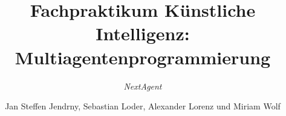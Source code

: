 \documentclass[runningheads]{llncs}
\begin{document}
%
\title{Fachpraktikum Künstliche Intelligenz: Multiagentenprogrammierung}
\subtitle{\textit{NextAgent}}
%
%
\author{Jan Steffen Jendrny,
	Sebastian Loder,
	Alexander Lorenz und
	Miriam Wolf
}
%
%
%
\maketitle              %
%
%
%
%
%









%
%
%
%
% 
% 
%

\end{document}

